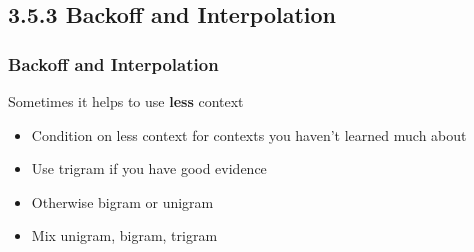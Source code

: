 \documentclass[13.5pt,aspecratio=169]{beamer}
\begin{document}
\subsection{3.5.3 Backoff and Interpolation}
\begin{frame}
    \onehalfspacing
        \frametitle{Backoff and Interpolation}
        {\Large Sometimes it helps to use \textbf{less} context}
        \begin{itemize}
            \item {Condition on less context for contexts you haven’t learned much about}
    
        \end{itemize}
        
        \begin{minipage}{0.5\textwidth}
            \begin{block}{}
                \begin{itemize}
                    \item Use trigram if you have good evidence
                    \item Otherwise bigram or unigram
                \end{itemize}
            \end{block}
        \end{minipage} \hspace{10pt}
        \begin{minipage}{0.45\textwidth}
            \begin{block}{}
                \begin{itemize}
                    \item Mix unigram, bigram, trigram \\ \vspace{5pt}
                    \hphantom{fndfjndnjfjnd}
                \end{itemize}
            \end{block}
        \end{minipage}
    
        \bigskip

       
    \end{frame}
\end{document}
